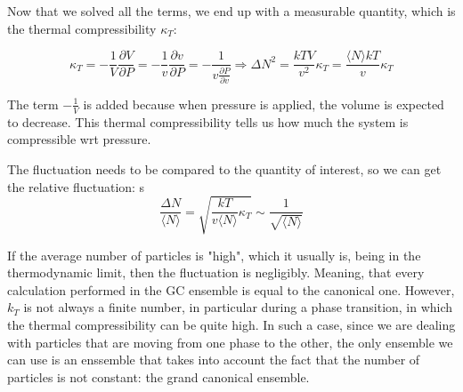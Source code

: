 	Now that we solved all the terms, we end up with a measurable quantity, which is the thermal compressibility $\kappa_T$:

	$$\kappa_T = -\frac{1}{V}\frac{\partial V}{\partial P} = -\frac{1}{v}\frac{\partial v}{\partial P} = -\frac{1}{v\frac{\partial P}{\partial v}}\Rightarrow\Delta N^2 = \frac{kTV}{v^2}\kappa_T = \frac{\langle N\rangle kT}{v}\kappa_T$$
	
	The term $ -\frac{1}{V}$ is added because when pressure is applied, the volume is expected to decrease. 
	This thermal compressibility tells us how much the system is compressible wrt pressure. 

	The fluctuation needs to be compared to the quantity of interest, so we can get the relative fluctuation:
s
	$$\frac{\Delta N}{\langle N\rangle} = \sqrt{\frac{kT}{v\langle N\rangle}\kappa_T}\sim\frac{1}{\sqrt{\langle N\rangle}}$$
	
	If the average number of particles is "high", which it usually is, being in the thermodynamic limit, then the fluctuation is negligibly.
	Meaning, that every calculation performed in the GC ensemble is equal to the canonical one.
	However, $k_T$ is not always a finite number, in particular during a phase transition, in which the thermal compressibility can be quite high.
	In such a case, since we are dealing with particles that are moving from one phase to the other, the only ensemble we can use is an enssemble that takes into account the fact that the number of particles is not constant: the grand canonical ensemble.
